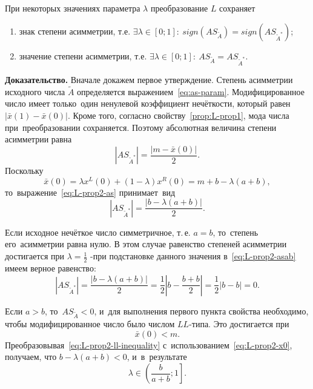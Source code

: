 \begin{prop}
\label{prop:L-prop2}
При некоторых значениях параметра $\lambda $ преобразование $L$ сохраняет
\begin{enumerate}
  \item знак степени асимметрии, т.е. $\exists \lambda \in [0;1]:\ sign(AS_{\tilde A})=sign(AS_{\tilde A^{*}})$;
  \item значение степени асимметрии, т.е. $\exists \lambda \in [0;1]:\ AS_{\tilde A}=AS_{\tilde A^{*}}$.
\end{enumerate}
\end{prop}
\textbf{Доказательство.} Вначале докажем первое утверждение. Степень асимметрии исходного числа $\tilde A$ определяется выражением~\eqref{eq:as-param}. Модифицированное число имеет только~один ненулевой коэффициент нечёткости, который равен $\left| \bar{x}\left( 1 \right)-\bar{x}\left( 0 \right) \right|$. Кроме того, согласно свойству~\ref{prop:L-prop1}, мода числа при~преобразовании сохраняется. Поэтому абсолютная величина степени асимметрии равна
\begin{equation}
\label{eq:L-prop2-as}
  \left| AS_{\tilde A^{*}} \right|=\frac{\left| m-\bar{x}\left( 0 \right) \right|}{2}.
\end{equation}
Поскольку
\begin{equation}
\label{eq:L-prop2-x0}
  \bar{x}\left( 0 \right)=\lambda {{x}^{L}}\left( 0 \right)+\left( 1-\lambda  \right){{x}^{R}}\left( 0 \right)=m+b-\lambda \left( a+b \right),
\end{equation}
то~выражение~\eqref{eq:L-prop2-as} принимает~вид
\begin{equation}
\label{eq:L-prop2-asab}
  \left| AS_{\tilde A^{*}} \right|=\frac{\left| b-\lambda \left( a+b \right) \right|}{2}.
\end{equation}

Если исходное нечёткое число симметричное, т.\,е. $a=b$, то~степень его~асимметрии равна нулю. В этом случае равенство степеней асимметрии достигается при $\displaystyle \lambda =\frac{1}{2}$ -при подстановке данного значения в~\eqref{eq:L-prop2-asab} имеем верное равенство:
\begin{equation*}
  \left| AS_{\tilde A^{*}} \right|=\frac{\left| b-\lambda \left( a+b \right) \right|}{2}=\frac{1}{2}\left| b-\frac{b+b}{2} \right|=\frac{1}{2}\left| b-b \right|=0.
\end{equation*}

Если $a>b$, то~$AS_{\tilde A}<0$, и~для выполнения первого пункта свойства необходимо, чтобы модифицированное число было числом $LL$-типа. Это достигается при
\begin{equation}
\label{eq:L-prop2-ll-inequality}
  \bar{x}\left( 0 \right)<m.
\end{equation}
Преобразовывая~\eqref{eq:L-prop2-ll-inequality} с~использованием~\eqref{eq:L-prop2-x0}, получаем, что $b-\lambda \left( a+b \right)<0$, и~в~результате 
\begin{equation*}
  \lambda \in \left( \frac{b}{a+b};1 \right].
\end{equation*}

